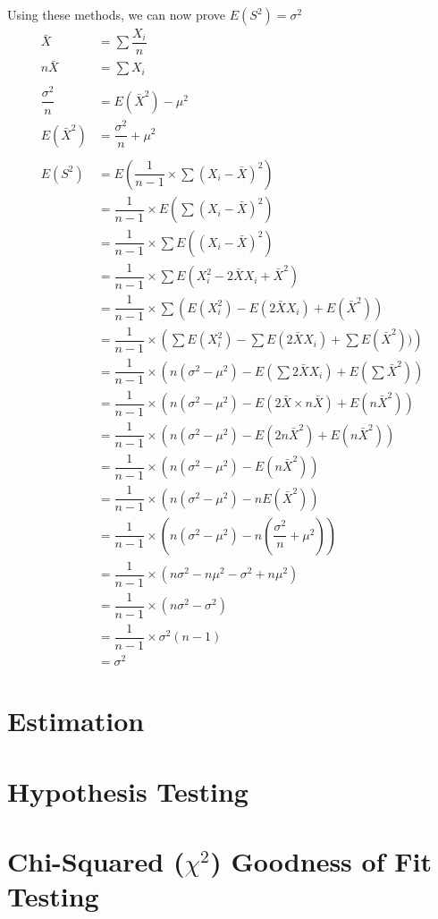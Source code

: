     Using these methods, we can now prove $E(S^2) = \sigma^2$
    \begin{align*}
        \bar{X}  &= \sum{\dfrac{X_i}{n}} \\
        n\bar{X} &= \sum{X_i}\\\\
        \dfrac{\sigma^2}{n} &= E(\bar{X}^2) - \mu^2 \\
        E(\bar{X}^2) &= \dfrac{\sigma^2}{n} + \mu^2
    \\\\
    E(S^2) &= E\left(\dfrac{1}{n-1} \times \sum{(X_i - \bar{X})^2}\right)               \\
           &= \dfrac{1}{n-1} \times E\left(\sum{(X_i - \bar{X})^2}\right)               \\
           &= \dfrac{1}{n-1} \times \sum{E((X_i - \bar{X})^2)}                          \\
           &= \dfrac{1}{n-1} \times \sum{E(X_i^2 - 2\bar{X}X_i + \bar{X}^2)}            \\
           &= \dfrac{1}{n-1} \times \sum{(E(X_i^2) - E(2\bar{X}X_i) + E(\bar{X}^2))}    \\
           &= \dfrac{1}{n-1} \times \left(\sum{E(X_i^2)} - \sum{E(2\bar{X}X_i)} + \sum{E(\bar{X}^2))}\right) \\
           &= \dfrac{1}{n-1} \times \left(n(\sigma^2 - \mu^2) - E\left(\sum{2\bar{X}X_i}\right) + E\left(\sum{\bar{X}^2}\right)\right)\\
           &= \dfrac{1}{n-1} \times \left(n(\sigma^2 - \mu^2) - E\left(2\bar{X} \times n\bar{X}\right) + E\left(n\bar{X}^2\right)\right)\\
           &= \dfrac{1}{n-1} \times \left(n(\sigma^2 - \mu^2) - E\left(2n\bar{X}^2\right) + E\left(n\bar{X}^2\right)\right)\\
           &= \dfrac{1}{n-1} \times \left(n(\sigma^2 - \mu^2) - E\left(n\bar{X}^2\right)\right)\\
           &= \dfrac{1}{n-1} \times \left(n(\sigma^2 - \mu^2) - nE\left(\bar{X}^2\right)\right)\\
           &= \dfrac{1}{n-1} \times \left(n(\sigma^2 - \mu^2) - n\left(\dfrac{\sigma^2}{n} + \mu^2\right)\right)\\
           &= \dfrac{1}{n-1} \times (n\sigma^2 - n\mu^2 - \sigma^2 + n\mu^2)\\
           &= \dfrac{1}{n-1} \times (n\sigma^2 - \sigma^2)\\
           &= \dfrac{1}{n-1} \times \sigma^2(n-1)\\
           &= \sigma^2
    \end{align*}

\section{Estimation}
\section{Hypothesis Testing}
\section{Chi-Squared ($\chi^2$) Goodness of Fit Testing}
